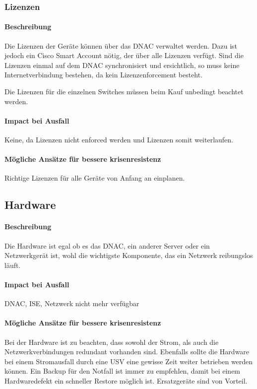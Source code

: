 \subsubsection{Lizenzen}
\paragraph{Beschreibung}
Die Lizenzen der Geräte können über das DNAC verwaltet werden. Dazu ist jedoch ein Cisco Smart Account nötig, der über alle Lizenzen verfügt. Sind die Lizenzen einmal auf dem DNAC synchronisiert und ersichtlich, so muss keine Internetverbindung bestehen, da kein Lizenzenforcement besteht.

Die Lizenzen für die einzelnen Switches müssen beim Kauf unbedingt beachtet werden.

\paragraph{Impact bei Ausfall}
Keine, da Lizenzen nicht enforced werden und Lizenzen somit weiterlaufen.

\paragraph{Mögliche Ansätze für bessere krisenresistenz}
Richtige Lizenzen für alle Geräte von Anfang an einplanen.

\subsection{Hardware}
\paragraph{Beschreibung}
Die Hardware ist egal ob es das DNAC, ein anderer Server oder ein Netzwerkgerät ist, wohl die wichtigste Komponente, das ein Netzwerk reibungslos läuft.

\paragraph{Impact bei Ausfall}
DNAC, ISE, Netzwerk nicht mehr verfügbar

\paragraph{Mögliche Ansätze für bessere krisenresistenz}
Bei der Hardware ist zu beachten, dass sowohl der Strom, als auch die Netzwerkverbindungen redundant vorhanden sind. Ebenfalls sollte die Hardware bei einem Stromausfall durch eine USV eine gewisse Zeit weiter betrieben werden können. Ein Backup für den Notfall ist immer zu empfehlen, damit bei einem Hardwaredefekt ein schneller Restore möglich ist.
Ersatzgeräte sind von Vorteil.

